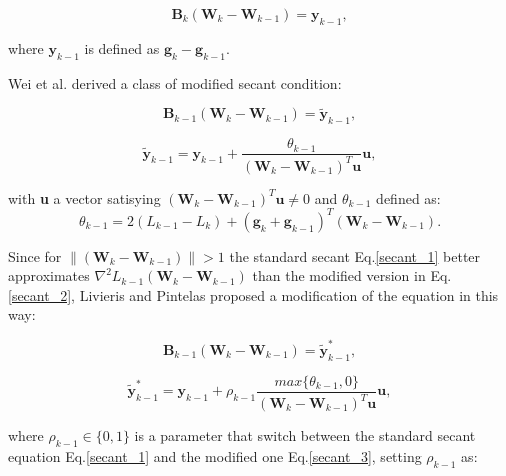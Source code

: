 			\begin{equation}
			\label{secant_1}
 				\textbf{B}_k (\textbf{W}_k - \textbf{W}_{k-1}) = \textbf{y}_{k-1},
 			\end{equation}

 			where $\textbf{y}_{k-1}$ is defined as $\textbf{g}_k - \textbf{g}_{k-1}$.

 			Wei et al. \cite{Zengxi-2006} derived a class of modified secant condition:

			\begin{equation}
			\label{secant_2}
 				\textbf{B}_{k-1} (\textbf{W}_k - \textbf{W}_{k-1}) = \widetilde{\textbf{y}}_{k-1},
 			\end{equation}


			\begin{equation}
			\label{secant_2}
 			 \widetilde{\textbf{y}}_{k-1} =  \textbf{y}_{k-1} + \frac{\theta_{k-1}}{(\textbf{W}_k - \textbf{W}_{k-1})^T\textbf{u}}\textbf{u},
 			\end{equation}

 			with \textbf{u} a vector satisying $(\textbf{W}_k - \textbf{W}_{k-1})^T\textbf{u} \neq 0$ and $\theta_{k-1}$ defined as:
 			\begin{equation}
			\label{theta}
 			 \theta_{k-1} = 2(\textit{L}_{k-1} - \textit{L}_{k}) + (\textbf{g}_k + \textbf{g}_{k-1})^T(\textbf{W}_k - \textbf{W}_{k-1}).
 			\end{equation}


 			Since for $\|(\textbf{W}_k - \textbf{W}_{k-1})\| > 1$ the standard secant Eq.\ref{secant_1} better approximates $\nabla^2\textit{L}_{k-1}(\textbf{W}_k - \textbf{W}_{k-1})$ than the modified version in Eq.\ref{secant_2}, Livieris and Pintelas\cite{LIVIERIS2013491} proposed a modification of the equation in this way:

 			\begin{equation}
			\label{secant_3}
 				\textbf{B}_{k-1} (\textbf{W}_k - \textbf{W}_{k-1}) = \widetilde{\textbf{y}}_{k-1}^*,
 			\end{equation}

 			\begin{equation}
			\label{y_3}
 				\widetilde{\textbf{y}}_{k-1}^* = \textbf{y}_{k-1} + \rho_{k-1} \frac{max\{\theta_{k-1},0\}}{(\textbf{W}_k - \textbf{W}_{k-1})^T\textbf{u}}\textbf{u},
 			\end{equation}

 			where $\rho_{k-1} \in \{0,1\}$ is a parameter that switch between the standard secant equation Eq.\ref{secant_1} and the modified one Eq.\ref{secant_3}, setting $\rho_{k-1}$ as:

